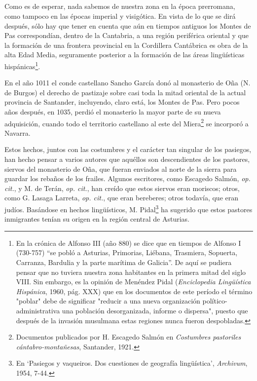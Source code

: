 \subsection{} Como es de esperar, nada sabemos de nuestra zona en la época prerromana, como tampoco en las épocas imperial y visigótica. En vista de lo que se dirá después, sólo hay que tener en cuenta que aún en tiempos antiguos los Montes de Pas correspondían, dentro de la Cantabria, a una región periférica oriental y que la formación de una frontera provincial en la Cordillera Cantábrica es obra de la alta Edad Media, seguramente posterior a la formación de las áreas lingüísticas hispánicas\footnote{En la crónica de Alfonso III (año 880) se dice que en tiempos de Alfonso I (730-757) ``se pobló a Asturias, Primorias, Liébana, Trasmiera, Sopuerta, Carranza, Bardulia y la parte marítima de Galicia''. De aquí se pudiera pensar que no tuviera nuestra zona habitantes en la primera mitad del siglo VIII. Sin embargo, es la opinión de Menéndez Pidal (\emph{Enciclopedia Lingüística Hispánica}, 1960, pág. XXX) que en los documentos de este período el término "poblar" debe de significar "reducir a una nueva organización político-administrativa una población desorganizada, informe o dispersa", puesto que después de la invasión musulmana estas regiones nunca fueron despobladas.}.

En el año 1011 el conde castellano Sancho García donó al monasterio de Oña (N. de Burgos) el derecho de pastizaje sobre casi toda la mitad oriental de la actual provincia de Santander, incluyendo, claro está, los Montes de Pas. Pero pocos años después, en 1035, perdió el monasterio la mayor parte de su nueva adquisición, cuando todo el territorio castellano al este del Miera\footnote{Documentos publicados por H. Escagedo Salmón en \emph{Costumbres
pastoriles cántabro-montañesas}, Santander, 1921.} se incorporó a Navarra.

Estos hechos, juntos con las costumbres y el carácter tan singular de los pasiegos, han hecho pensar a varios autores que aquéllos son descendientes de los pastores, siervos del monasterio de Oña, que fueran enviados al norte de la sierra para guardar los rebaños de los frailes.
Algunos escritores, como Escagedo Salmón, \emph{op. cit.}, y M. de Terán, \emph{op. cit.}, han creído que estos siervos eran moriscos; otros, como G. Lasaga Larreta, \emph{op. cit.}, que eran bereberes; otros todavía, que eran judíos. Basándose en hechos lingüísticos, M. Pidal\footnote{En `Pasiegos y vaqueiros. Dos cuestiones de geografía lingüística', \emph{Archivum}, 1954, 7-44.} ha sugerido que estos pastores inmigrantes tenían su origen en la región central de Asturias.

